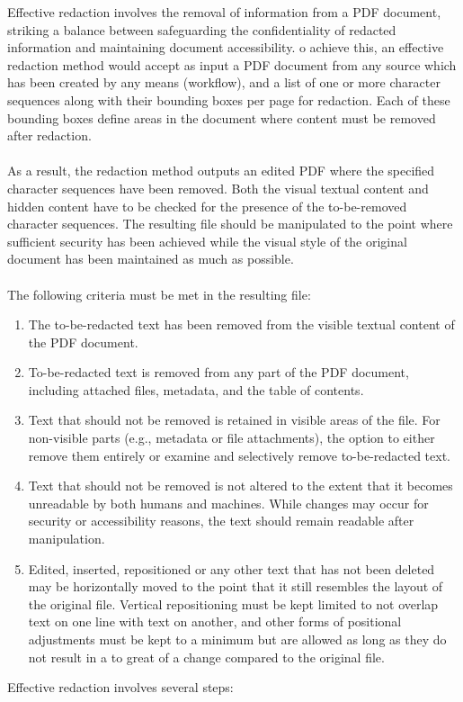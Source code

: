 Effective redaction involves the removal of information from a PDF document, striking a balance between safeguarding the confidentiality of redacted information and maintaining document accessibility. o achieve this, an effective redaction method would accept as input a PDF document from any source which has been created by any means (workflow), and a list of one or more character sequences along with their bounding boxes per page for redaction. Each of these bounding boxes define areas in the document where content must be removed after redaction.
\\\\
As a result, the redaction method outputs an edited PDF where the specified character sequences have been removed. Both the visual textual content and hidden content have to be checked for the presence of the to-be-removed character sequences. The resulting file should be manipulated to the point where sufficient security has been achieved while the visual style of the original document has been maintained as much as possible. 
\\\\
The following criteria must be met in the resulting file:
\begin{enumerate}
    \item The to-be-redacted text has been removed from the visible textual content of the PDF document.
    \item To-be-redacted text is removed from any part of the PDF document, including attached files, metadata, and the table of contents.
    \item Text that should not be removed is retained in visible areas of the file. For non-visible parts (e.g., metadata or file attachments), the option to either remove them entirely or examine and selectively remove to-be-redacted text. 
    \item Text that should not be removed is not altered to the extent that it becomes unreadable by both humans and machines. While changes may occur for security or accessibility reasons, the text should remain readable after manipulation. 
    \item Edited, inserted, repositioned or any other text that has not been deleted may be horizontally moved to the point that it still resembles the layout of the original file. Vertical repositioning must be kept limited to not overlap text on one line with text on another, and other forms of positional adjustments must be kept to a minimum but are allowed as long as they do not result in a to great of a change compared to the original file.
\end{enumerate}
Effective redaction involves several steps:

